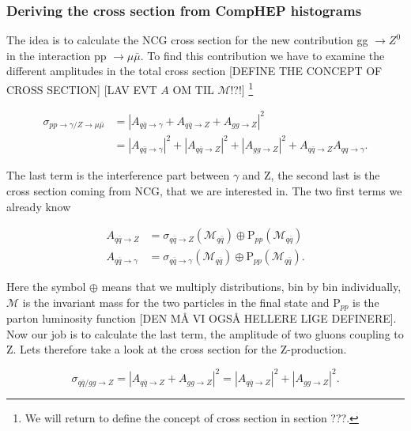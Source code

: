 \subsubsection{Deriving the cross section from CompHEP histograms}

The idea is to calculate the NCG cross section for the new contribution gg $\rightarrow Z^0$ in the interaction pp $\rightarrow \mu \bar \mu$. To find this contribution we have to examine the different amplitudes in the total cross section [DEFINE THE CONCEPT OF CROSS SECTION] [LAV EVT $A$ OM TIL $\mathcal{M}$!?!] \footnote{We will return to define the concept of cross section in section ???.}

\begin{align}
\sigma_{pp \rightarrow \gamma/ Z \rightarrow \mu \bar \mu} &= |A_{q \bar q \rightarrow \gamma} + A_{q \bar q \rightarrow Z} + A_{gg \rightarrow Z}|^{2} \nonumber \\
&= |A_{q \bar q \rightarrow \gamma}|^{2} + |A_{q \bar q \rightarrow Z}|^ {2} + |A_{gg \rightarrow Z}|^{2} + A_{q \bar q \rightarrow Z }A_{qq \rightarrow \gamma}.
\end{align}

The last term is the interference part between $\gamma$ and Z, the second last is the cross section coming from NCG, that we are interested in. The two first terms we already know

\begin{align}
A_{q \bar q \rightarrow Z} &= \sigma_{q \bar q \rightarrow Z} (\mathcal{M}_{q \bar q}) \oplus \textrm{P}_{pp}(\mathcal{M}_{q \bar q}) \nonumber \\ 
A_{q \bar q \rightarrow \gamma} &= \sigma_{q \bar q \rightarrow  \gamma}( \mathcal{M}_{q \bar q}) \oplus \textrm{P}_{pp}(\mathcal{M}_{q \bar q}).
\end{align}

Here the symbol $\oplus$ means that we multiply distributions, bin by bin individually, $\mathcal{M}$ is the invariant mass for the two particles in the final state and P$_{pp}$ is the parton luminosity function [DEN MÅ VI OGSÅ HELLERE LIGE DEFINERE]. Now our job is to calculate the last term, the amplitude of two gluons coupling to Z. Lets therefore take a look at the cross section for the Z-production.

\begin{equation}
\sigma_{q \bar q/gg \rightarrow Z} = |A_{q \bar q \rightarrow Z} + A_{gg \rightarrow Z}|^{2}=|A_{q \bar q \rightarrow Z}|^{2}+|A_{gg \rightarrow Z}|^{2}.
\end{equation}

